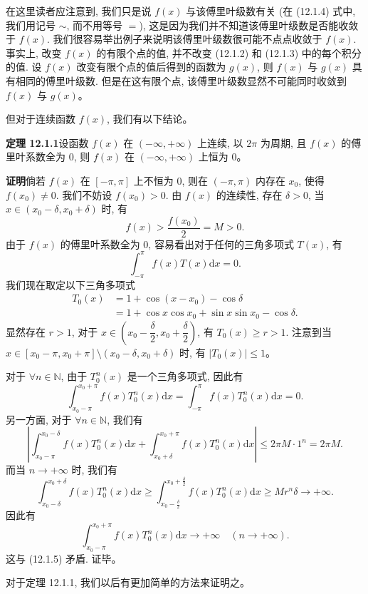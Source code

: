 \documentclass[UTF8,12pt,a4paper,fontset=fandol]{ctexart}
\begin{document}
在这里读者应注意到, 我们只是说 $f(x)$ 与该傅里叶级数有关 (在 (12.1.4) 式中, 我们用记号 $\sim$, 而不用等号 $=$), 这是因为我们并不知道该傅里叶级数是否能收敛于 $f(x)$. 我们很容易举出例子来说明该傅里叶级数很可能不点点收敛于 $f(x)$. 事实上, 改变 $f(x)$ 的有限个点的值, 并不改变 (12.1.2) 和 (12.1.3) 中的每个积分的值. 设 $f(x)$ 改变有限个点的值后得到的函数为 $g(x)$, 则 $f(x)$ 与 $g(x)$ 具有相同的傅里叶级数. 但是在这有限个点, 该傅里叶级数显然不可能同时收敛到 $f(x)$ 与 $g(x)$。

但对于连续函数 $f(x)$, 我们有以下结论。

\noindent\textbf{定理 12.1.1}\quad 设函数 $f(x)$ 在 $(-\infty,+\infty)$ 上连续, 以 $2\pi$ 为周期, 且 $f(x)$ 的傅里叶系数全为 $0$, 则 $f(x)$ 在 $(-\infty,+\infty)$ 上恒为 $0$。

\noindent\textbf{证明}\quad 倘若 $f(x)$ 在 $[-\pi,\pi]$ 上不恒为 $0$, 则在 $(-\pi,\pi)$ 内存在 $x_0$, 使得 $f(x_0)\ne0$. 我们不妨设 $f(x_0)>0$. 由 $f(x)$ 的连续性, 存在 $\delta>0$, 当 $x\in(x_0-\delta,x_0+\delta)$ 时, 有
\[
  f(x)>\frac{f(x_0)}{2}=M>0.
\]
由于 $f(x)$ 的傅里叶系数全为 $0$, 容易看出对于任何的三角多项式 $T(x)$, 有
\[
  \int_{-\pi}^{\pi}f(x)T(x)\mathrm dx=0.
\]
我们现在取定以下三角多项式
\[
\begin{aligned}
  T_0(x)&=1+\cos(x-x_0)-\cos\delta\\
  &=1+\cos x\cos x_0+\sin x\sin x_0-\cos\delta.
\end{aligned}
\]
显然存在 $r>1$, 对于 $x\in\left(x_0-\dfrac{\delta}{2},x_0+\dfrac{\delta}{2}\right)$, 有 $T_0(x)\geqslant r>1$. 注意到当 $x\in[x_0-\pi,x_0+\pi]\setminus(x_0-\delta,x_0+\delta)$ 时, 有 $|T_0(x)|\leqslant1$。

对于 $\forall n\in\mathbb N$, 由于 $T_0^n(x)$ 是一个三角多项式, 因此有
\begin{equation}
  \int_{x_0-\pi}^{x_0+\pi}f(x)T_0^n(x)\mathrm dx
  =\int_{-\pi}^{\pi}f(x)T_0^n(x)\mathrm dx=0.
  \tag{12.1.5}
\end{equation}
另一方面, 对于 $\forall n\in\mathbb N$, 我们有
\[
  \left|
    \int_{x_0-\pi}^{x_0-\delta}f(x)T_0^n(x)\mathrm dx
    +\int_{x_0+\delta}^{x_0+\pi}f(x)T_0^n(x)\mathrm dx
  \right|\leqslant 2\pi M\cdot1^n=2\pi M.
\]
而当 $n\to+\infty$ 时, 我们有
\[
  \int_{x_0-\delta}^{x_0+\delta}f(x)T_0^n(x)\mathrm dx
  \geqslant \int_{x_0-\frac{\delta}{2}}^{x_0+\frac{\delta}{2}}f(x)T_0^n(x)\mathrm dx
  \geqslant Mr^n\delta\to+\infty.
\]
因此有
\[
  \int_{x_0-\pi}^{x_0+\pi}f(x)T_0^n(x)\mathrm dx\to+\infty
  \quad (n\to+\infty).
\]
这与 (12.1.5) 矛盾. 证毕。

对于定理 12.1.1, 我们以后有更加简单的方法来证明之。
\end{document}
